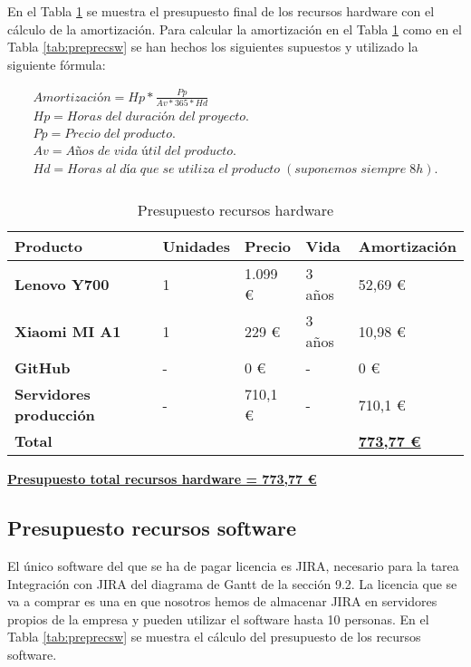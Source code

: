 En el Tabla \ref{tab:preprechw} se muestra el presupuesto final de los recursos hardware con el cálculo de la amortización. Para calcular la amortización en el Tabla \ref{tab:preprechw} como en el Tabla \ref{tab:preprecsw} se han hechos los siguientes supuestos y utilizado la siguiente fórmula:

\label{eq:amortizacion}
\begin{align*}
Amortización = Hp * \frac{Pp}{Av*365*Hd} \\
Hp = Horas \; del \; duración \; del \; proyecto. \\
Pp = Precio \; del \; producto. \\
Av = Años \; de \; vida \; útil \; del \; producto. \\
Hd = Horas \; al \; día \; que \; se \; utiliza \; el \; producto \; (suponemos \; siempre \; 8h). \\
\end{align*}

\begin{table}[H]\label{tab:preprechw}
	\centering
	\begin{tabular}{|l|l|l|l|l|}
		\hline
		\textbf{Producto}               & \textbf{Unidades} & \textbf{Precio} & \textbf{Vida} & \textbf{Amortización} \\ \hline
		\textbf{Lenovo Y700}            & 1                 & 1.099 € \cite{Tfg:ideapad} & 3 años        & 52,69 €               \\ \hline
		\textbf{Xiaomi MI A1}           & 1                 & 229 € \cite{Tfg:mia1}      & 3 años        & 10,98 €               \\ \hline
		\textbf{GitHub}                 & -                 & 0 €             & -             & 0 €                   \\ \hline
		\textbf{Servidores producción}  & -                 & 710,1 €         & -             & 710,1 €               \\ \hline
		\multicolumn{4}{|l|}{\textbf{Total}} & \textbf{\underline{773,77 €}}                                        \\ \hline
	\end{tabular}
	\caption{Presupuesto recursos hardware}
\end{table}

\textbf{\underline{Presupuesto total recursos hardware = 773,77 €}}

\subsection{Presupuesto recursos software}
El único software del que se ha de pagar licencia es JIRA, necesario para la tarea Integración con JIRA del diagrama de Gantt de la sección 9.2. La licencia que se va a comprar es una en que nosotros hemos de almacenar JIRA en servidores propios de la empresa y pueden utilizar el software hasta 10 personas. En el Tabla \ref{tab:preprecsw} se muestra el cálculo del presupuesto de los recursos software.

